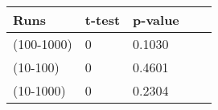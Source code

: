 
\begin{tabular}{lllll}

{\bf Runs} & {\bf t-test} & {\bf p-value}  \\ \hline

(100-1000) & 0 & 0.1030 \\
(10-100) & 0 & 0.4601  \\
(10-1000) & 0 & 0.2304 \\

\hline
\end{tabular}
